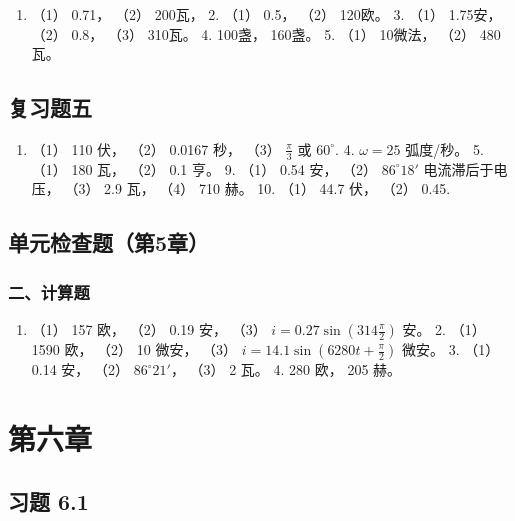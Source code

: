 \begin{enumerate}
\def\labelenumi{\arabic{enumi}.}
\tightlist
\item
  （1） 0.71， （2） 200瓦， 2. （1） 0.5， （2） 120欧。 3. （1）
  1.75安， （2） 0.8， （3） 310瓦。 4. 100盏， 160盏。 5. （1）
  10微法， （2） 480瓦。
\end{enumerate}

\subsection{复习题五}\label{ux590dux4e60ux9898ux4e94-1}

\begin{enumerate}
\def\labelenumi{\arabic{enumi}.}
\setcounter{enumi}{2}
\tightlist
\item
  （1） 110 伏， （2） 0.0167 秒， （3） \(\frac{\pi}{3}\) 或
  \(60^{\circ}\). 4. \(\omega = 25\) 弧度/秒。 5. （1） 180 瓦， （2）
  0.1 亨。 9. （1） 0.54 安， （2） \(86^{\circ}18'\) 电流滞后于电压，
  （3） 2.9 瓦， （4） 710 赫。 10. （1） 44.7 伏， （2） 0.45.
\end{enumerate}

\subsection{单元检查题（第5章）}\label{ux5355ux5143ux68c0ux67e5ux9898ux7b2c5ux7ae0-1}

\subsubsection{二、计算题}\label{ux4e8cux8ba1ux7b97ux9898-3}

\begin{enumerate}
\def\labelenumi{\arabic{enumi}.}
\tightlist
\item
  （1） 157 欧， （2） 0.19 安， （3）
  \(i = 0.27 \sin \left(314 \frac{\pi}{2}\right)\) 安。 2. （1） 1590
  欧， （2） 10 微安， （3）
  \(i = 14.1 \sin \left(6280 t + \frac{\pi}{2}\right)\) 微安。 3. （1）
  0.14 安， （2） \(86^{\circ} 21'\)， （3） 2 瓦。 4. 280 欧， 205 赫。
\end{enumerate}

\section{第六章}\label{ux7b2cux516dux7ae0}

\subsection{习题 6.1}\label{ux4e60ux9898-6.1-1}

